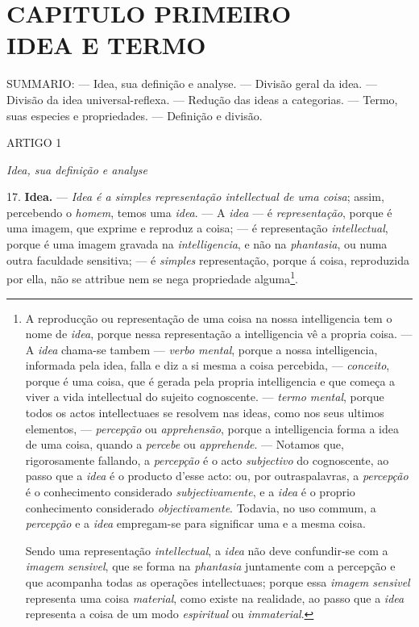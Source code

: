 
\chapter*{CAPITULO PRIMEIRO\\[0.3em]\large IDEA E TERMO}

  SUMMARIO: --- Idea, sua definição e analyse. --- Divisão geral da idea. --- Divisão da idea universal-reflexa. --- Redução das ideas a categorias. --- Termo, suas especies e propriedades. --- Definição e divisão.

ARTIGO 1

\emph{Idea, sua definição e analyse}

17. \textbf{Idea.} --- \emph{Idea é a simples representação intellectual de uma coisa}; assim, percebendo o \emph{homem}, temos uma \emph{idea}. --- A \emph{idea} --- é \emph{representação}, porque é uma imagem, que exprime e reproduz a coisa; --- é representação \emph{intellectual}, porque é uma imagem gravada na \emph{intelligencia}, e não na \emph{phantasia}, ou numa outra faculdade sensitiva; --- é \emph{simples} representação, porque á coisa, reproduzida por ella, não se attribue nem se nega propriedade alguma\footnote{A reproducção ou representação de uma coisa na nossa intelligencia tem o nome de \emph{idea}, porque nessa representação a intelligencia vê a propria coisa. --- A \emph{idea} chama-se tambem --- \emph{verbo mental}, porque a nossa intelligencia, informada pela idea, falla e diz a si mesma a coisa percebida, --- \emph{conceito}, porque é uma coisa, que é gerada pela propria intelligencia e que começa a viver a vida intellectual do sujeito cognoscente. --- \emph{termo mental}, porque todos os actos intellectuaes se resolvem nas ideas, como nos seus ultimos elementos, --- \emph{percepção} ou \emph{apprehensão}, porque a intelligencia forma a idea de uma coisa, quando a \emph{percebe} ou \emph{apprehende}. --- Notamos que, rigorosamente fallando, a \emph{percepção} é o acto \emph{subjectivo} do cognoscente, ao passo que a \emph{idea} é o producto d'esse acto: ou, por outraspalavras, a \emph{percepção} é o conhecimento considerado \emph{subjectivamente}, e a \emph{idea} é o proprio conhecimento considerado \emph{objectivamente}. Todavia, no uso commum, a \emph{percepção} e a \emph{idea} empregam-se para significar uma e a mesma coisa.\par Sendo uma representação \emph{intellectual}, a \emph{idea} não deve confundir-se com a \emph{imagem sensivel}, que se forma na \emph{phantasia} juntamente com a percepção e que acompanha todas as operações intellectuaes; porque essa \emph{imagem sensivel} representa uma coisa \emph{material}, como existe na realidade, ao passo que a \emph{idea} representa a coisa de um modo \emph{espiritual} ou \emph{immaterial}.}.

